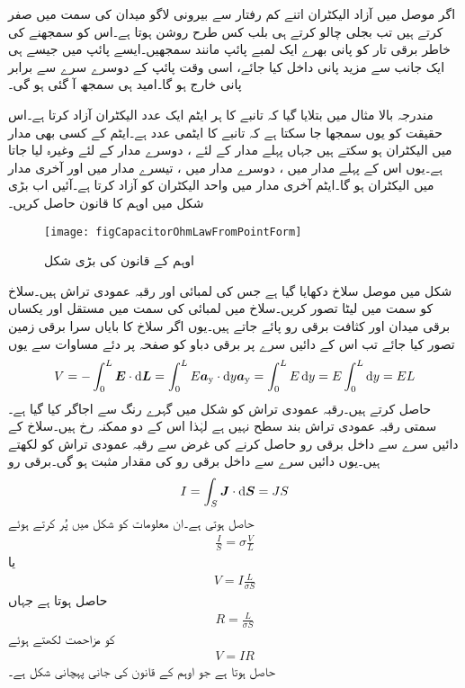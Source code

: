 اگر موصل میں آزاد الیکٹران اتنے کم رفتار سے بیرونی لاگو میدان کی سمت میں صفر کرتے ہیں تب بجلی چالو کرتے ہی بلب  کس طرح روشن ہوتا ہے۔اس کو سمجھنے کی خاطر برقی تار کو پانی بھرے ایک لمبے  پائپ مانند سمجھیں۔ایسے پائپ میں جیسے ہی ایک جانب سے مزید پانی داخل کیا جائے، اسی وقت پائپ کے دوسرے سرے سے برابر پانی خارج ہو گا۔امید ہی سمجھ آ گئی ہو گی۔  

مندرجہ بالا مثال میں بتلایا گیا کہ تانبے کا ہر ایٹم ایک عدد الیکٹران آزاد کرتا ہے۔اس حقیقت کو یوں سمجھا جا سکتا ہے کہ تانبے کا ایٹمی عدد ہے۔ایٹم کے کسی بھی مدار میں    الیکٹران ہو سکتے ہیں جہاں پہلے مدار کے لئے ، دوسرے مدار کے لئے  وغیرہ لیا جاتا ہے۔یوں اس کے پہلے مدار میں ، دوسرے مدار میں ، تیسرے مدار میں  اور آخری مدار میں  الیکٹران ہو گا۔ایٹم آخری مدار میں واحد الیکٹران کو آزاد کرتا ہے۔آئیں اب بڑی شکل میں اوہم کا قانون حاصل کریں۔ 
\begin{figure}
\centering
\texttt{[image: figCapacitorOhmLawFromPointForm]}
\caption{اوہم کے قانون کی بڑی شکل}
\label{شکل_کپیسٹر_اوہم_قانون_بڑی_شکل}
\end{figure}

شکل  میں  موصل سلاخ دکھایا گیا ہے جس کی لمبائی  اور  رقبہ عمودی تراش  ہیں۔سلاخ کو  سمت میں لیٹا تصور کریں۔سلاخ میں لمبائی کی سمت میں مستقل اور یکساں برقی میدان   اور کثافت برقی رو  پائے جاتے ہیں۔یوں اگر سلاخ کا بایاں سرا برقی زمین تصور کیا جائے تب اس کے دائیں سرے پر برقی دباو کو صفحہ  پر دئے مساوات  سے یوں
\begin{align*}
V= -\int_0^L \kvec{E} \cdot \dif \kvec{L}=\int_0^L E \ay \cdot \dif  y \ay=\int_0^L E \dif y=E\int_0^L \dif y=EL
\end{align*}
حاصل کرتے ہیں۔رقبہ عمودی تراش کو شکل میں گہرے رنگ سے اجاگر کیا گیا ہے۔سمتی رقبہ عمودی تراش بند سطح نہیں ہے لہٰذا اس کے دو ممکنہ رخ ہیں۔سلاخ کے دائیں سرے سے داخل برقی رو حاصل کرنے کی غرض سے رقبہ عمودی تراش کو  لکھتے ہیں۔یوں دائیں سرے سے داخل برقی رو کی مقدار مثبت ہو گی۔برقی رو
\begin{align*}
I=\int_S \kvec{J} \cdot \dif \kvec{S}=JS
\end{align*}
حاصل ہوتی ہے۔ان معلومات کو شکل  میں پُر کرتے ہوئے
\begin{align*}
\frac{I}{S}=\sigma \frac{V}{L}
\end{align*}
  یا
\begin{align*}
V=I \frac{L}{\sigma S}
\end{align*}
حاصل ہوتا ہے جہاں
\begin{align}\label{مساوات_کپیسٹر_سلاخ_کی_مزاحمت}
R= \frac{L}{\sigma S}
\end{align}
کو مزاحمت لکھتے ہوئے
\begin{align}\label{مساوات_کپیسٹر_اوہم_قانون_بڑی_شکل}
V=IR
\end{align}
حاصل ہوتا ہے جو اوہم کے قانون کی جانی پہچانی شکل ہے۔

